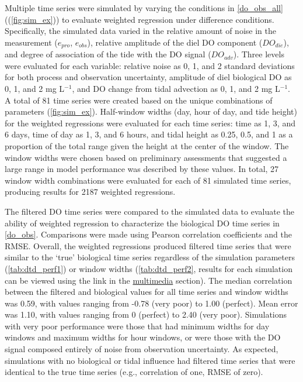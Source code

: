 \documentclass[letterpaper,12pt,oneside]{article}\usepackage[]{graphicx}\usepackage[]{color}
\begin{document}
Multiple time series were simulated by varying the conditions in \cref{do_obs_all} ((\cref{fig:sim_ex})) to evaluate weighted regression under difference conditions. Specifically, the simulated data varied in the relative amount of noise in the measurement ($e_{pro}$, $e_{obs}$), relative amplitude of the diel \ac{DO} component ($DO_{die}$), and degree of association of the tide with the \ac{DO} signal ($DO_{adv}$).  Three levels were evaluated for each variable: relative noise as 0, 1, and 2 standard deviations for both process and observation uncertainty, amplitude of diel biological \ac{DO} as 0, 1, and 2 mg L$^{-1}$, and \ac{DO} change from tidal advection as 0, 1, and 2 mg L$^{-1}$. A total of 81 time series were created based on the unique combinations of parameters (\cref{fig:sim_ex}).  Half-window widths (day, hour of day, and tide height) for the weighted regressions were evaluated for each time series: time as 1, 3, and 6 days, time of day as 1, 3, and 6 hours, and tidal height as 0.25, 0.5, and 1 as a proportion of the total range given the height at the center of the window.  The window widths were chosen based on preliminary assessments that suggested a large range in model performance was described by these values.  In total, 27 window width combinations were evaluated for each of 81 simulated time series, producing results for 2187 weighted regressions.

The filtered \ac{DO} time series were compared to the simulated data to evaluate the ability of weighted regression to characterize the biological \ac{DO} time series in \cref{do_obs}. Comparisons were made using Pearson correlation coefficients and the \ac{RMSE}.  Overall, the weighted regressions produced filtered time series that were similar to the `true' biological time series regardless of the simulation parameters (\cref{tab:dtd_perf1}) or window widths (\cref{tab:dtd_perf2}, results for each simulation can be viewed using the link in the \hyperref[multi]{multimedia} section).  The median correlation between the filtered and biological values for all time series and window widths was 0.59, with values ranging from -0.78 (very poor) to 1.00 (perfect).  Mean error was 1.10, with values ranging from 0 (perfect) to 2.40 (very poor).  Simulations with very poor performance were those that had minimum widths for day windows and maximum widths for hour windows, or were those with the \ac{DO} signal composed entirely of noise from observation uncertainty. As expected, simulations with no biological or tidal influence had filtered time series that were identical to the true time series (e.g., correlation of one, \ac{RMSE} of zero).  
\end{document}
